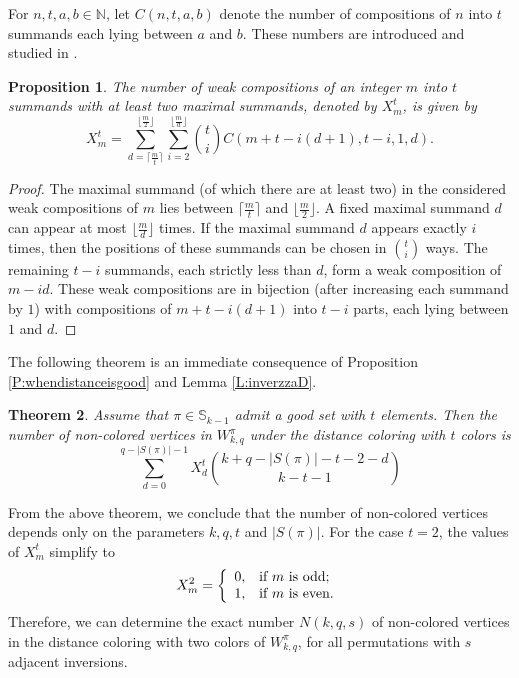 \documentclass{birkjour}
\newtheorem{thm}{Theorem}[section]
\newtheorem{prop}[thm]{Proposition}
\theoremstyle{definition}
\theoremstyle{remark}
\numberwithin{equation}{section}
\begin{document}
For $n,t,a,b\in \mathbb{N}$, let $C(n,t,a,b)$ denote the number of
compositions of $n$ into $t$ summands each lying between $a$ and
$b$. These numbers are introduced and studied in \cite{slo}.

\begin{prop}
The number of weak compositions of an integer $m$ into $t$
summands with at least two maximal summands, denoted by $X^t_m$,
is given by
$$X^t_m=\sum_{d=\lceil\frac m t \rceil}^{\lfloor \frac m 2\rfloor}
\sum_{i=2}^{\lfloor\frac m d \rfloor}{t \choose
i}C(m+t-i(d+1),t-i,1,d).$$
\end{prop}
\begin{proof}
The maximal summand (of which there are at least two) in the
considered weak compositions of $m$ lies between $\lceil\frac m t
\rceil$ and $\lfloor \frac m 2\rfloor$. A fixed maximal summand
$d$ can appear at most $\lfloor\frac m d \rfloor$ times. If the
maximal summand $d$ appears exactly $i$ times, then the positions
of these summands can be chosen in ${t\choose i}$ ways. The
remaining $t-i$ summands, each strictly less than $d$, form a weak
composition of $m-id$. These weak compositions are in bijection
(after increasing each summand by $1$) with compositions of
$m+t-i(d+1)$ into $t-i$ parts, each lying between $1$ and $d$.
\end{proof} The following theorem is an immediate consequence of Proposition
\ref{P:whendistanceisgood} and Lemma \ref{L:inverzzaD}.

\begin{thm}\label{T:brneobojenih} Assume that $\pi\in \mathbb{S}_{k-1}$
admit a good set with $t$ elements. Then the number of non-colored
vertices in $W^\pi_{k,q}$ under the distance coloring with $t$
colors is
$$\sum_{d=0}^{q-|S(\pi)|-1}X^t_d{k+q-|S(\pi)|-t-2-d\choose k-t-1}$$
\end{thm}
From the above theorem, we conclude that the number of non-colored
vertices depends only on the parameters $k,q,t$ and $|S(\pi)|$.
For the case $t=2$, the values of $X^t_m$ simplify to
\begin{equation}\label{E:Xzat=2}
    X^2_m=\left\{%
\begin{array}{ll}
    0, & \hbox{if $m$ is odd;} \\
    1, & \hbox{if $m$ is even.} \\
\end{array}%
\right.
\end{equation}
Therefore, we can determine the exact number $N(k,q,s)$ of
non-colored vertices in the distance coloring with two colors of
$W^\pi_{k,q}$, for all permutations with $s$ adjacent inversions.
\end{document}

